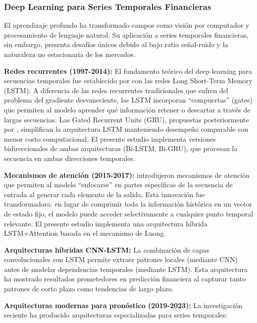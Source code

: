 \documentclass[11pt,a4paper]{article}
\begin{document}
\subsubsection{Deep Learning para Series Temporales Financieras}

El aprendizaje profundo ha transformado campos como visión por computador y procesamiento de lenguaje natural. Su aplicación a series temporales financieras, sin embargo, presenta desafíos únicos debido al bajo ratio señal-ruido y la naturaleza no estacionaria de los mercados.

\textbf{Redes recurrentes (1997-2014):} El fundamento teórico del deep learning para secuencias temporales fue establecido por \citet{hochreiter1997lstm} con las redes Long Short-Term Memory (LSTM). A diferencia de las redes recurrentes tradicionales que sufren del problema del gradiente desvaneciente, las LSTM incorporan ``compuertas'' (gates) que permiten al modelo aprender qué información retener o descartar a través de largas secuencias. Las Gated Recurrent Units (GRU), propuestas posteriormente por \citet{cho2014gru}, simplifican la arquitectura LSTM manteniendo desempeño comparable con menor costo computacional. El presente estudio implementa versiones bidireccionales de ambas arquitecturas (Bi-LSTM, Bi-GRU), que procesan la secuencia en ambas direcciones temporales.

\textbf{Mecanismos de atención (2015-2017):} \citet{luong2015attention} introdujeron mecanismos de atención que permiten al modelo ``enfocarse'' en partes específicas de la secuencia de entrada al generar cada elemento de la salida. Esta innovación fue transformadora: en lugar de comprimir toda la información histórica en un vector de estado fijo, el modelo puede acceder selectivamente a cualquier punto temporal relevante. El presente estudio implementa una arquitectura híbrida LSTM+Attention basada en el mecanismo de Luong.

\textbf{Arquitecturas híbridas CNN-LSTM:} La combinación de capas convolucionales con LSTM permite extraer patrones locales (mediante CNN) antes de modelar dependencias temporales (mediante LSTM). Esta arquitectura ha mostrado resultados prometedores en predicción financiera al capturar tanto patrones de corto plazo como tendencias de largo plazo.

\textbf{Arquitecturas modernas para pronóstico (2019-2023):} La investigación reciente ha producido arquitecturas especializadas para series temporales:
\end{document}
